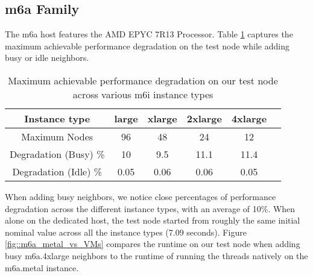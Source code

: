 \subsection{m6a Family}
The m6a host features the AMD EPYC 7R13 Processor. Table \ref{tab::max_m6a} captures the maximum 
achievable performance degradation on the test node while adding busy or idle neighbors. 

\begin{table}[H]
\begin{center}
\begin{tabular}{ |c|c|c|c|c|c }
 Instance type & large & xlarge & 2xlarge & 4xlarge \\
 \hline
 Maximum Nodes & 96 & 48 & 24 & 12  \\
 \hline
Degradation (Busy) \% & 10 & 9.5 & 11.1 & 11.4  \\ 
\hline 
Degradation (Idle) \% & 0.05 & 0.06 & 0.06 & 0.05  \\ 
\end{tabular}
\end{center}
\caption{Maximum achievable performance degradation on our test node across various m6i instance types}
\label{tab::max_m6a}
\end{table}
\noindent
When adding busy neighbors, we notice close percentages of performance 
degradation across the different instance types,  with an average of 10\%. 
When alone on the dedicated host, the test node started from roughly the same initial nominal value 
across all the instance types (7.09 seconds). 
Figure \ref{fig::m6a_metal_vs_VMs} compares the runtime on our 
test node when adding busy m6a.4xlarge neighbors to the runtime of running the threads natively on 
the m6a.metal instance. 

